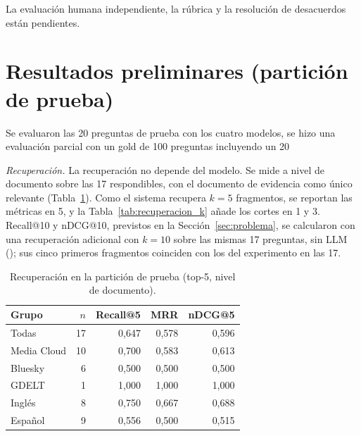 \documentclass[conference]{IEEEtran}
\begin{document}
La evaluación humana independiente, la rúbrica y la resolución de desacuerdos están pendientes.

\section{Resultados preliminares (partición de prueba)}
\label{sec:resultados}
Se evaluaron las 20 preguntas de prueba con los cuatro modelos, se hizo una evaluación parcial con un gold de 100 preguntas incluyendo un 20%

\textit{Recuperación.} La recuperación no depende del modelo. Se mide a nivel de documento sobre las 17 respondibles, con el documento de evidencia como único relevante (Tabla~\ref{tab:recuperacion}). Como el sistema recupera $k=5$ fragmentos, se reportan las métricas en 5, y la Tabla~\ref{tab:recuperacion_k} añade los cortes en 1 y 3. Recall@10 y nDCG@10, previstos en la Sección~\ref{sec:problema}, se calcularon con una recuperación adicional con $k=10$ sobre las mismas 17 preguntas, sin LLM (); sus cinco primeros fragmentos coinciden con los del experimento en las 17.

\begin{table}[ht]
\centering
\caption{Recuperación en la partición de prueba (top-5, nivel de documento).}
\label{tab:recuperacion}
\begin{tabular}{lrrrr}
\toprule
Grupo & $n$ & Recall@5 & MRR & nDCG@5 \\
\midrule
Todas & 17 & 0,647 & 0,578 & 0,596 \\
Media Cloud & 10 & 0,700 & 0,583 & 0,613 \\
Bluesky & 6 & 0,500 & 0,500 & 0,500 \\
GDELT & 1 & 1,000 & 1,000 & 1,000 \\
Inglés & 8 & 0,750 & 0,667 & 0,688 \\
Español & 9 & 0,556 & 0,500 & 0,515 \\
\bottomrule
\end{tabular}
\end{table}
\end{document}
